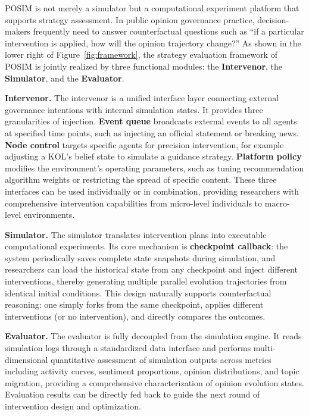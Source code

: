 \documentclass[a4paper,fleqn]{cas-dc}
\begin{document}
POSIM is not merely a simulator but a computational experiment platform that supports strategy assessment. In public opinion governance practice, decision-makers frequently need to answer counterfactual questions such as ``if a particular intervention is applied, how will the opinion trajectory change?'' As shown in the lower right of Figure~\ref{fig:framework}, the strategy evaluation framework of POSIM is jointly realized by three functional modules: the \textbf{Intervenor}, the \textbf{Simulator}, and the \textbf{Evaluator}.

\textbf{Intervenor.} The intervenor is a unified interface layer connecting external governance intentions with internal simulation states. It provides three granularities of injection. \textbf{Event queue} broadcasts external events to all agents at specified time points, such as injecting an official statement or breaking news. \textbf{Node control} targets specific agents for precision intervention, for example adjusting a KOL's belief state to simulate a guidance strategy. \textbf{Platform policy} modifies the environment's operating parameters, such as tuning recommendation algorithm weights or restricting the spread of specific content. These three interfaces can be used individually or in combination, providing researchers with comprehensive intervention capabilities from micro-level individuals to macro-level environments.

\textbf{Simulator.} The simulator translates intervention plans into executable computational experiments. Its core mechanism is \textbf{checkpoint callback}: the system periodically saves complete state snapshots during simulation, and researchers can load the historical state from any checkpoint and inject different interventions, thereby generating multiple parallel evolution trajectories from identical initial conditions. This design naturally supports counterfactual reasoning: one simply forks from the same checkpoint, applies different interventions (or no intervention), and directly compares the outcomes.

\textbf{Evaluator.} The evaluator is fully decoupled from the simulation engine. It reads simulation logs through a standardized data interface and performs multi-dimensional quantitative assessment of simulation outputs across metrics including activity curves, sentiment proportions, opinion distributions, and topic migration, providing a comprehensive characterization of opinion evolution states. Evaluation results can be directly fed back to guide the next round of intervention design and optimization.
\end{document}
